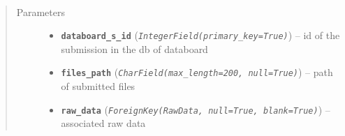 \documentclass[letterpaper,10pt,english]{sphinxmanual}
\begin{document}
\begin{fulllineitems}
\label{modules/models:runapp.models.Submission}~\begin{quote}\begin{description}
\item[{Parameters}] \leavevmode\begin{itemize}
\item {} 
\textbf{\texttt{databoard\_s\_id}} (\emph{\texttt{IntegerField(primary\_key=True)}}) -- id of the submission in the db of databoard

\item {} 
\textbf{\texttt{files\_path}} (\emph{\texttt{CharField(max\_length=200, null=True)}}) -- path of submitted files

\item {} 
\textbf{\texttt{raw\_data}} (\emph{\texttt{ForeignKey(RawData, null=True, blank=True)}}) -- associated raw data

\end{itemize}

\end{description}\end{quote}

\end{fulllineitems}

\end{document}

